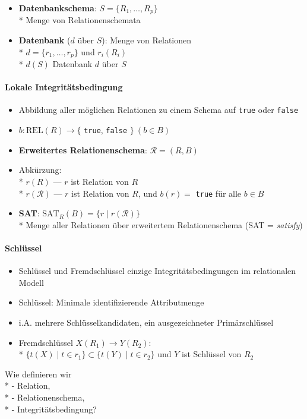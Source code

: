 \begin{itemize}
	\item \textbf{Datenbankschema}: \( S = \{ R_1, \dots, R_p \} \) \\* Menge von Relationenschemata
	\item \textbf{Datenbank} (\( d \) über \( S \)): Menge von Relationen \\* \( d = \{ r_1, \dots, r_p \} \) und \( r_i(R_i) \) \\* \( d(S) \) Datenbank \( d \) über \( S \)
\end{itemize}

\paragraph{Lokale Integritätsbedingung}
\begin{itemize}
	\item Abbildung aller möglichen Relationen zu einem Schema auf \lstinline{true} oder \lstinline{false}
	\item \( b: \text{REL}(R) \to \{ \) \lstinline{true}, \lstinline{false} \( \} \ (b \in B) \)
	\item \textbf{Erweitertes Relationenschema}: \( \mathcal{R} = (R, B) \)
	\item Abkürzung: \\* \( r(R) \) --- \( r \) ist Relation von \( R \) \\* \( r(\mathcal{R}) \) --- \( r \) ist Relation von \( R \), und \( b(r)= \) \lstinline{true} für alle \( b \in B \)
	\item \textbf{SAT}: \( \text{SAT}_R(B) = \{ r \mid r(\mathcal{R}) \} \) \\* Menge aller Relationen über erweitertem Relationenschema (SAT = \emph{satisfy})
\end{itemize}

\paragraph{Schlüssel}
\begin{itemize}
	\item Schlüssel und Fremdschlüssel einzige Integritätsbedingungen im relationalen Modell
	\item Schlüssel: Minimale identifizierende Attributmenge
	\item i.A. mehrere Schlüsselkandidaten, ein ausgezeichneter Primärschlüssel
	\item Fremdschlüssel \( X(R_1) \to Y(R_2) \): \\*
	\( \{ t(X) \mid t \in r_1 \} \subset \{ t(Y) \mid t \in r_2 \}  \) und $Y$ ist Schlüssel von $R_2$
\end{itemize}

\begin{fragen}
	\item Wie definieren wir \\*
		- Relation, \\*
		- Relationenschema, \\*
		- Integritätsbedingung?
\end{fragen}